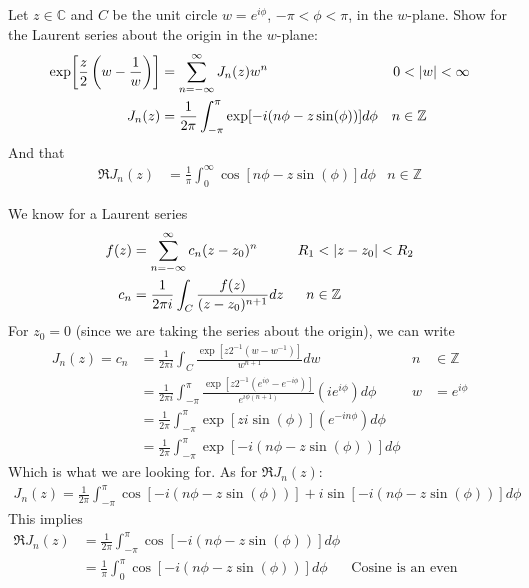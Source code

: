\documentclass[12pt, english]{book}
\makeatletter
\renewenvironment{proof}[1][\proofname]{\par
	\pushQED{\qed}%
	\normalfont \topsep6\p@\@plus6\p@\relax
	\list{}{%
		\settowidth{\leftmargin}{\itshape\proofname:\hskip\labelsep}%
		\setlength{\labelwidth}{0pt}%
		\setlength{\itemindent}{-\leftmargin}%
		}%
	\item[\hskip\labelsep\itshape#1\@addpunct{:}]\ignorespaces
	}{\popQED\endlist\@endpefalse}
\makeatother
\begin{document}
	\begin{example}
		Let \(z \in \mathbb{C}\) and \(C\) be the unit circle \(w = e^{i\phi}\), \(-\pi<\phi<\pi\), in the \(w\)-plane. Show for the Laurent series about the origin in the \(w\)-plane:
		\begin{align*}
			\exp[\frac{z}{2}\left(w - \frac{1}{w}\right)]
			&= \sum_{n=-\infty}^{\infty} J_n(z)w^n	&	0&<\abs{w}<\infty \\
			J_n (z) 
			&= \frac{1}{2\pi} \int_{-\pi}^{\pi} \exp[-i(n\phi - z\sin(\phi))] d \phi 
				&	n &\in \mathbb{Z}
		\end{align*}
		And that 
		\begin{align}
			\Re{J_n(z)} &= \frac{1}{\pi} \int_{0}^{\infty} \cos[n\phi - z \sin(\phi)] d\phi
				& n \in \mathbb{Z}
		\end{align}
		\begin{proof}
			{\color{Grey}
			We know for a Laurent series
			\begin{align*}
				f(z) &= \sum_{n=-\infty}^{\infty} c_n(z-z_0)^n & R_1 &< \abs{z-z_0} < R_2 \\
				c_n &= \frac{1}{2\pi i} \int_{C} \frac{f(z)}{(z-z_0)^{n+1}} dz & n &\in \mathbb{Z}
			\end{align*}
			For \(z_0 = 0\) (since we are taking the series about the origin), we can write
			\begin{align*}
				J_n(z) = c_n 
				&= \frac{1}{2\pi i} \int_{C} \frac{\exp[z2^{-1}(w - w^{-1})]}{w^{n+1}} dw 
					& n &\in \mathbb{Z} \\
				&= \frac{1}{2\pi i} \int_{-\pi}^{\pi} 
				   \frac{\exp[z2^{-1}(e^{i\phi} - e^{-i\phi})]}{e^{i\phi(n+1)}} (ie^{i\phi}) d\phi & w &= e^{i\phi} \\
				&= \frac{1}{2\pi} \int_{-\pi}^{\pi} 
				\exp[zi\sin(\phi)] (e^{-in\phi}) d\phi \\
				&= \frac{1}{2\pi} \int_{-\pi}^{\pi} 
				\exp[-i(n\phi - z\sin(\phi))]  d\phi 
			\end{align*}
			Which is what we are looking for. As for \(\Re{J_n(z)}\):
			\begin{align*}
				J_n(z) = \frac{1}{2\pi} \int_{-\pi}^{\pi} 
				\cos[-i(n\phi - z\sin(\phi))] + i\sin [-i(n\phi - z\sin(\phi))] d\phi 
			\end{align*}
			This implies
			\begin{align*}
				\Re{J_n(z)} 
				&= \frac{1}{2\pi} \int_{-\pi}^{\pi}	\cos[-i(n\phi - z\sin(\phi))] d\phi \\
				&= \frac{1}{\pi} \int_{0}^{\pi}	\cos[-i(n\phi - z\sin(\phi))] d\phi 
					& \text{Cosine is an even function}
			\end{align*}
			}
		\end{proof}
	\end{example}
\end{document}
